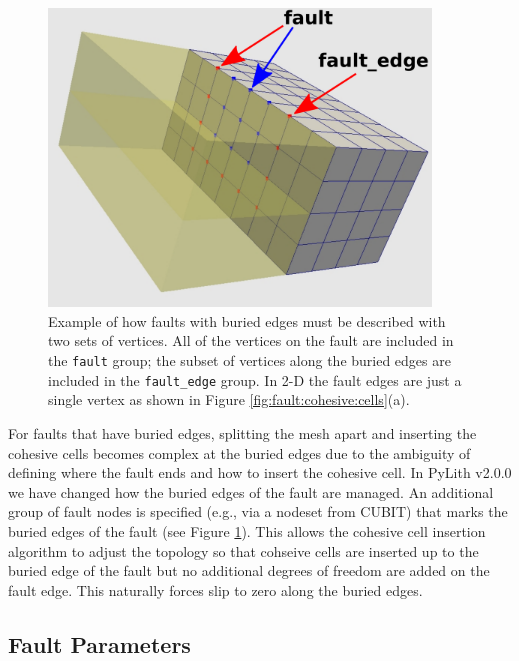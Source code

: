 \begin{figure}[H]
\begin{centering}
\includegraphics[width=4in]{boundaryconditions/figs/faultEdge}
\par\end{centering}

\caption{Example of how faults with buried edges must be described with two
sets of vertices. All of the vertices on the fault are included in
the \texttt{fault} group; the subset of vertices along the buried
edges are included in the \texttt{fault\_edge} group. In 2-D the fault
edges are just a single vertex as shown in Figure \ref{fig:fault:cohesive:cells}(a).\label{fig:fault:fault_edge}}
\end{figure}
For faults that have buried edges, splitting the mesh apart and inserting
the cohesive cells becomes complex at the buried edges due to the
ambiguity of defining where the fault ends and how to insert the cohesive
cell. In PyLith v2.0.0 we have changed how the buried edges of the
fault are managed. An additional group of fault nodes is specified
(e.g., via a nodeset from CUBIT) that marks the buried edges of the
fault (see Figure \ref{fig:fault:fault_edge}). This allows the cohesive
cell insertion algorithm to adjust the topology so that cohseive cells
are inserted up to the buried edge of the fault but no additional
degrees of freedom are added on the fault edge. This naturally forces
slip to zero along the buried edges.


\subsection{Fault Parameters}

